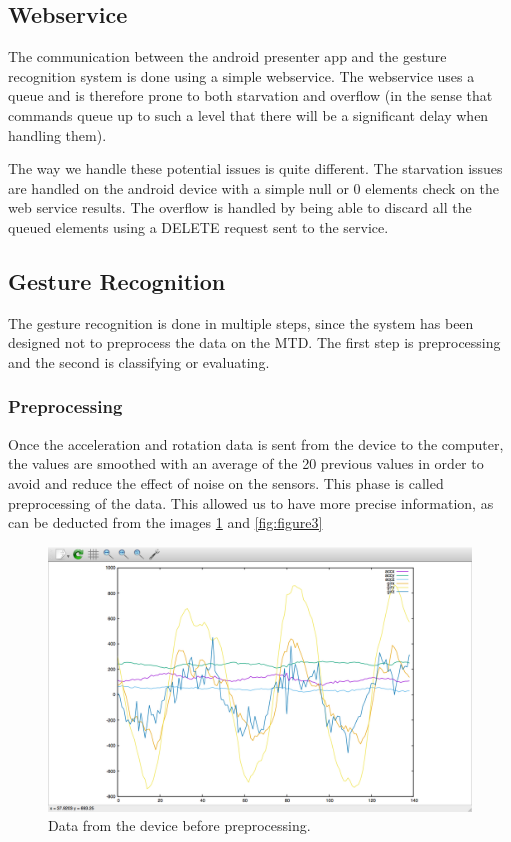 \subsection{Webservice}
The communication between the android presenter app and the gesture recognition system is done using a simple webservice.
The webservice uses a queue and is therefore prone to both starvation and overflow
(in the sense that commands queue up to such a level that there will be a significant delay when handling them).

The way we handle these potential issues is quite different.
The starvation issues are handled on the android device with a simple null or 0 elements check on the web service results.
The overflow is handled by being able to discard all the queued elements using a DELETE request sent to the service.

\subsection{Gesture Recognition}
The gesture recognition is done in multiple steps, since the system has been designed not to preprocess the data on the MTD.
The first step is preprocessing and the second is classifying or evaluating.

\subsubsection{Preprocessing}
Once the acceleration and rotation data is sent from the device to the computer,
 the values are smoothed with an average of the 20 previous values in order to avoid and reduce the effect of noise on the sensors.
 This phase is called preprocessing of the data. 
 This allowed us to have more precise information, as can be deducted from the images  \ref{fig:figure2} and \ref{fig:figure3}

\begin{figure}[h]
\centering
\includegraphics[width=1\columnwidth]{img/raw}
\caption{Data from the device before preprocessing.}
\label{fig:figure2}
\end{figure}

